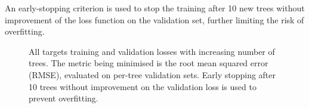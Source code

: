 An early-stopping criterion is used to stop the training after 10 new trees without improvement of the loss function on the validation set, further limiting the risk of overfitting.
\begin{figure}[ht]
\centering
{}
\caption{All targets training and validation losses with increasing number of trees. The metric being minimised is  the root mean squared error (RMSE), evaluated on per-tree validation sets. Early stopping after 10 trees without improvement on the validation loss is used to prevent overfitting.}
\label{fig:all_losses_curves}       %
\end{figure}



